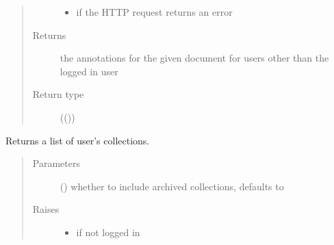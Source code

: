 \documentclass[letterpaper,10pt,english]{sphinxmanual}
\begin{document}
\begin{fulllineitems}
\begin{fulllineitems}
\begin{quote}
\begin{description}
\begin{itemize}
\item {} 
\sphinxAtStartPar
{\hyperref[\detokenize{autoapi/pine/client/exceptions/index:pine.client.exceptions.PineClientHttpException}]{}} \textendash{} if the HTTP request returns an error

\end{itemize}

\item[{Returns}] \leavevmode
\sphinxAtStartPar
the annotations for the given document for users other than the logged in user

\item[{Return type}] \leavevmode
\sphinxAtStartPar
{}(())

\end{description}\end{quote}

\end{fulllineitems}


\begin{fulllineitems}
\label{\detokenize{autoapi/pine/client/index:pine.client.PineClient.list_collections}}
\sphinxAtStartPar
Returns a list of user’s collections.
\begin{quote}\begin{description}
\item[{Parameters}] \leavevmode
\sphinxAtStartPar
{} () \textendash{} whether to include archived collections, defaults to 

\item[{Raises}] \leavevmode\begin{itemize}
\item {} 
\sphinxAtStartPar
{\hyperref[\detokenize{autoapi/pine/client/exceptions/index:pine.client.exceptions.PineClientAuthException}]{}} \textendash{} if not logged in


\end{itemize}
\end{description}
\end{quote}
\end{fulllineitems}
\end{fulllineitems}
\end{document}
